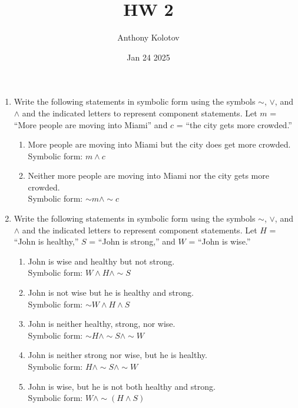 \documentclass{article}
\title{HW 2}
\author{Anthony Kolotov}
\date{Jan 24 2025}
\begin{document}
	
	\maketitle
	
	\begin{enumerate}
		\item Write the following statements in symbolic form using the symbols \( \sim \), \( \lor \), and \( \land \) and the indicated letters to represent component statements. Let \( m \) = “More people are moving into Miami” and \( c \) = “the city gets more crowded.”
		\begin{enumerate}
			\item More people are moving into Miami but the city does get more crowded. \\
			Symbolic form: \( m \land c \)
			
			\item Neither more people are moving into Miami nor the city gets more crowded. \\
			Symbolic form: \( \sim m \land \sim c \)
		\end{enumerate}
		
		\item Write the following statements in symbolic form using the symbols \( \sim \), \( \lor \), and \( \land \) and the indicated letters to represent component statements. Let \( H \) = “John is healthy,” \( S \) = “John is strong,” and \( W \) = “John is wise.”
		\begin{enumerate}
			\item John is wise and healthy but not strong. \\
			Symbolic form: \( W \land H \land \sim S \)
			
			\item John is not wise but he is healthy and strong. \\
			Symbolic form: \( \sim W \land H \land S \)
			
			\item John is neither healthy, strong, nor wise. \\
			Symbolic form: \( \sim H \land \sim S \land \sim W \)
			
			\item John is neither strong nor wise, but he is healthy. \\
			Symbolic form: \( H \land \sim S \land \sim W \)
			
			\item John is wise, but he is not both healthy and strong. \\
			Symbolic form: \( W \land \sim (H \land S) \)
		\end{enumerate}
		

\end{enumerate}
\end{document}
